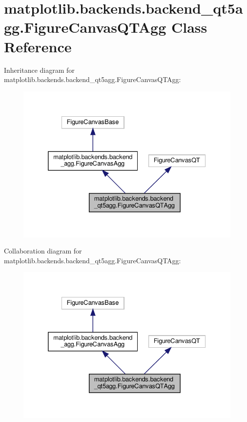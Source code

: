 \hypertarget{classmatplotlib_1_1backends_1_1backend__qt5agg_1_1FigureCanvasQTAgg}{}\section{matplotlib.\+backends.\+backend\+\_\+qt5agg.\+Figure\+Canvas\+Q\+T\+Agg Class Reference}
\label{classmatplotlib_1_1backends_1_1backend__qt5agg_1_1FigureCanvasQTAgg}


Inheritance diagram for matplotlib.\+backends.\+backend\+\_\+qt5agg.\+Figure\+Canvas\+Q\+T\+Agg\+:
\nopagebreak
\begin{figure}[H]
\begin{center}
\leavevmode
\includegraphics[width=332pt]{classmatplotlib_1_1backends_1_1backend__qt5agg_1_1FigureCanvasQTAgg__inherit__graph}
\end{center}
\end{figure}


Collaboration diagram for matplotlib.\+backends.\+backend\+\_\+qt5agg.\+Figure\+Canvas\+Q\+T\+Agg\+:
\nopagebreak
\begin{figure}[H]
\begin{center}
\leavevmode
\includegraphics[width=332pt]{classmatplotlib_1_1backends_1_1backend__qt5agg_1_1FigureCanvasQTAgg__coll__graph}
\end{center}
\end{figure}
